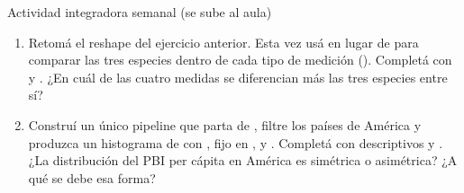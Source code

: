 \documentclass[8pt]{beamer}
\begin{document}
	\begin{frame}[fragile]{Actividad integradora semanal (se sube al aula)}
		\begin{enumerate}[start = 4]
			\item Retomá el reshape del ejercicio anterior. Esta vez usá  en lugar de  para comparar las tres especies dentro de cada tipo de medición (). Completá con  y . ¿En cuál de las cuatro medidas se diferencian más las tres especies entre sí?

			\item Construí un único pipeline que parta de , filtre los países de América y produzca un histograma de  con ,  fijo en ,  y . Completá con  descriptivos y . ¿La distribución del PBI per cápita en América es simétrica o asimétrica? ¿A qué se debe esa forma?
		\end{enumerate}
	\end{frame}
\end{document}
